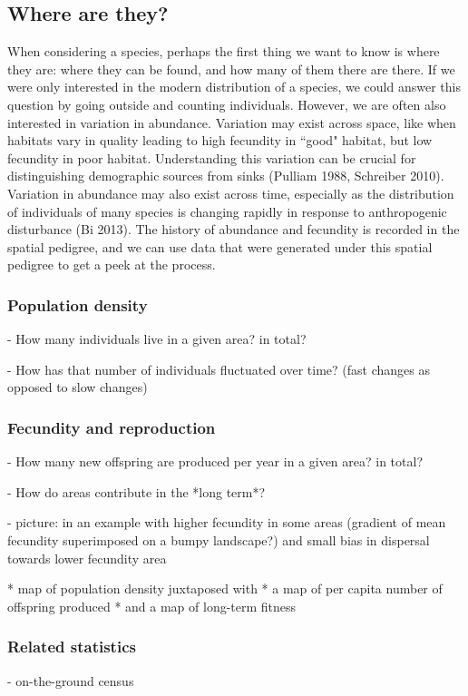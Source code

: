 \documentclass{ar-1col}
\begin{document}
\subsection{Where are they?}
When considering a species, 
perhaps the first thing we want to know is where they are: 
where they can be found, and how many of them there are there.
If we were only interested in the modern distribution of a species, 
we could answer this question by going outside and counting individuals.
However, we are often also interested in variation in abundance.
Variation may exist across space,
like when habitats vary in quality
leading to high fecundity in ``good" habitat, 
but low fecundity in poor habitat.
Understanding this variation can be crucial for 
distinguishing demographic sources from sinks (Pulliam 1988, Schreiber 2010).
Variation in abundance may also exist across time,
especially as the distribution of individuals of many species is changing rapidly 
in response to anthropogenic disturbance (Bi 2013).
The history of abundance and fecundity is recorded in the spatial pedigree, 
and we can use data that were generated under this spatial pedigree 
to get a peek at the process.

\subsubsection{Population density}
        - How many individuals live in a given area? in total?

        - How has that number of individuals fluctuated over time? (fast changes as opposed to slow changes)

\subsubsection{Fecundity and reproduction}
        - How many new offspring are produced per year in a given area? in total?

        - How do areas contribute in the *long term*?

        - picture: 
            in an example with higher fecundity in some areas 
            (gradient of mean fecundity superimposed on a bumpy landscape?)
            and small bias in dispersal towards lower fecundity area

            * map of population density juxtaposed with
            * a map of per capita number of offspring produced
            * and a map of long-term fitness 
            
\subsubsection{Related statistics}
        - on-the-ground census
        
\end{document}
